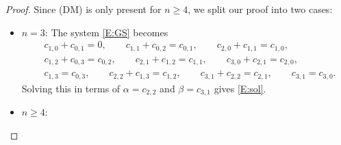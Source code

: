 \documentclass[10pt,a4paper]{amsart}
\numberwithin{equation}{section}
\begin{document}
\begin{proof}
Since (DM) is only present for $n \geq 4$, we split our proof into two cases:
\begin{itemize}\itemsep=0pt
\item $n=3$: The system \eqref{E:GS} becomes
\begin{align*}
 &c_{1,0} + c_{0,1} = 0, \qquad
 c_{1,1} + c_{0,2} = c_{0,1},\qquad
 c_{2,0} + c_{1,1} = c_{1,0}, \\
 &c_{1,2} + c_{0,3} = c_{0,2}, \qquad
 c_{2,1} + c_{1,2} = c_{1,1}, \qquad
 c_{3,0} + c_{2,1} = c_{2,0}, \\
& c_{1,3} = c_{0,3}, \qquad
 c_{2,2} + c_{1,3} = c_{1,2}, \qquad
 c_{3,1} + c_{2,2} = c_{2,1}, \qquad
 c_{3,1} = c_{3,0}.
\end{align*}
Solving this in terms of $\alpha = c_{2,2}$ and $\beta = c_{3,1}$ gives \eqref{E:sol}.
\item $n \ge 4$:
	

\end{itemize}
\end{proof}
\end{document}
